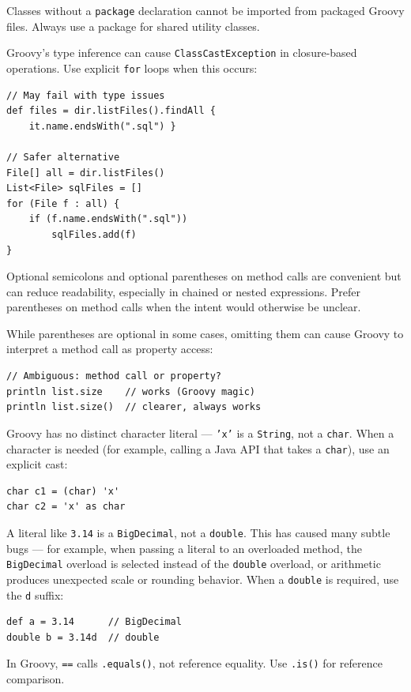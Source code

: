 \begin{description}[style=nextline]
  \item[Default package] Classes without a \texttt{package} declaration cannot be imported from packaged Groovy files.  Always use a package for shared utility classes.

  \item[Closure type inference] Groovy's type inference can cause \texttt{ClassCastException} in closure-based operations.  Use explicit \texttt{for} loops when this occurs:
  \begin{lstlisting}[style=groovy]
// May fail with type issues
def files = dir.listFiles().findAll {
    it.name.endsWith(".sql") }

// Safer alternative
File[] all = dir.listFiles()
List<File> sqlFiles = []
for (File f : all) {
    if (f.name.endsWith(".sql"))
        sqlFiles.add(f)
}
  \end{lstlisting}

  \item[Optional syntax can hurt readability] Optional semicolons and optional parentheses on method calls are convenient but can reduce readability, especially in chained or nested expressions.  Prefer parentheses on method calls when the intent would otherwise be unclear.

  \item[Parentheses ambiguity] While parentheses are optional in some cases, omitting them can cause Groovy to interpret a method call as property access:
  \begin{lstlisting}[style=groovy]
// Ambiguous: method call or property?
println list.size    // works (Groovy magic)
println list.size()  // clearer, always works
  \end{lstlisting}

  \item[No \texttt{char} type] Groovy has no distinct character literal --- \texttt{'x'} is a \texttt{String}, not a \texttt{char}.  When a character is needed (for example, calling a Java API that takes a \texttt{char}), use an explicit cast:
  \begin{lstlisting}[style=groovy]
char c1 = (char) 'x'
char c2 = 'x' as char
  \end{lstlisting}

  \item[Floating-point literals are \texttt{BigDecimal}] A literal like \texttt{3.14} is a \texttt{BigDecimal}, not a \texttt{double}.  This has caused many subtle bugs --- for example, when passing a literal to an overloaded method, the \texttt{BigDecimal} overload is selected instead of the \texttt{double} overload, or arithmetic produces unexpected scale or rounding behavior.  When a \texttt{double} is required, use the \texttt{d} suffix:
  \begin{lstlisting}[style=groovy]
def a = 3.14      // BigDecimal
double b = 3.14d  // double
  \end{lstlisting}

  \item[\texttt{==} vs \texttt{.equals()}] In Groovy, \texttt{==} calls \texttt{.equals()}, not reference equality.  Use \texttt{.is()} for reference comparison.
\end{description}
